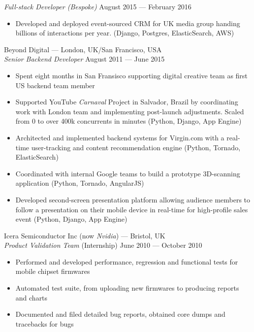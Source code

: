 \documentclass[margin, 10pt]{res}
\begin{document}
\begin{resume}
{\sl Full-stack Developer (Bespoke)} \hfill August 2015 --- February 2016 \\

\begin{itemize}
\item Developed and deployed event-sourced CRM for UK media group handing billions of
interactions per year. (Django, Postgres, ElasticSearch, AWS)
\end{itemize}

Beyond Digital --- London, UK/San Francisco, USA \\
{\sl Senior Backend Developer} \hfill August 2011 --- June 2015 \\

\begin{itemize} \itemsep -1pt
\item Spent eight months in San Fransisco supporting digital creative team as first US backend team member
\item Supported YouTube \textit{Carnaval} Project in Salvador, Brazil by coordinating work with London team and implementing post-launch adjustments. Scaled from 0 to over 400k concurrents in minutes (Python, Django, App Engine)
\item Architected and implemented backend systems for Virgin.com with a real-time user-tracking and content recommendation engine (Python, Tornado, ElasticSearch)
\item Coordinated with internal Google teams to build a prototype 3D-scanning application (Python, Tornado, AngularJS)
\item Developed second-screen presentation platform allowing audience members to follow a presentation on their mobile device in real-time for high-profile sales event (Python, Django, App Engine)
\end{itemize}

Icera Semiconductor Inc (now \textit{Nvidia}) --- Bristol, UK \\
{\sl Product Validation Team} \hfill (Internship) June 2010 --- October 2010 \\
\begin{itemize} \itemsep -1pt
\item Performed and developed performance, regression and functional tests for mobile chipset firmwares
\item Automated test suite, from uploading new firmwares to producing reports and charts
\item Documented and filed detailed bug reports, obtained core dumps and tracebacks for bugs
\end{itemize}


\end{resume}
\end{document}
